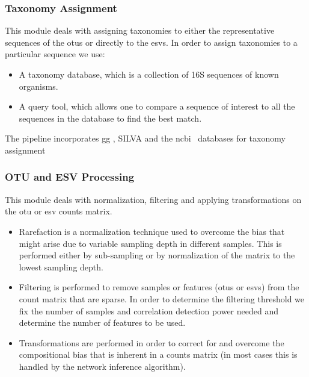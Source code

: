   \subsubsection*{Taxonomy Assignment}
    \vspace{-5mm}
    This module deals with assigning taxonomies to either the representative sequences of the \ac{otu}s or directly to the \ac{esv}s.
    In order to assign taxonomies to a particular sequence we use:
    \begin{itemize}
      \item A taxonomy database, which is a collection of 16S sequences of known organisms.
      \item A query tool, which allows one to compare a sequence of interest to all the sequences in the database to find the best match.
    \end{itemize}
    The pipeline incorporates \ac{gg} \cite{DeSantis2006}, SILVA \cite{Quast2012} and the \ac{ncbi}~\cite{Sayers2009} databases for taxonomy assignment

  \subsubsection*{OTU and ESV Processing}
    \vspace{-5mm}
    This module deals with normalization, filtering and applying transformations on the \ac{otu} or \ac{esv} counts matrix.
    \begin{itemize}
      \item Rarefaction is a normalization technique used to overcome the bias that might arise due to variable sampling depth in different samples. This is performed either by sub-sampling or by normalization of the matrix to the lowest sampling depth.
      \item Filtering is performed to remove samples or features (\ac{otu}s or \ac{esv}s) from the count matrix that are sparse. In order to determine the filtering threshold we fix the number of samples and correlation detection power needed  and determine the number of features to be used.
      \item Transformations are performed in order to correct for and overcome the compositional bias that is inherent in a counts matrix (in most cases this is handled by the network inference algorithm).
    \end{itemize}


